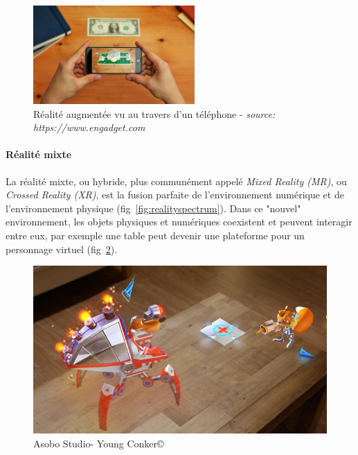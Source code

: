 \begin{figure}
\centering
\includegraphics[width=0.55\textwidth]{images/AR}
\caption{Réalité augmentée vu au travers d'un téléphone - \textit{source: https://www.engadget.com}}
\label{fig:AR}
\end{figure}

\paragraph{Réalité mixte}
La réalité mixte, ou hybride, plus communément appelé \emph{Mixed Reality (MR)}, ou \emph{Crossed Reality (XR)}, est la fusion parfaite de l'environnement numérique et de l'environnement physique (fig~\ref{fig:realityspectrum}). Dans ce "nouvel" environnement, les objets physiques et numériques coexistent et peuvent interagir entre eux, par exemple une table peut devenir une plateforme pour un personnage virtuel (fig~\ref{fig:youngconker}).

\begin{figure}[h]
\centering
\includegraphics[scale=0.4]{images/youngconker}
\caption{Asobo Studio\texttrademark - Young Conker\copyright}
\label{fig:youngconker}
\end{figure}

